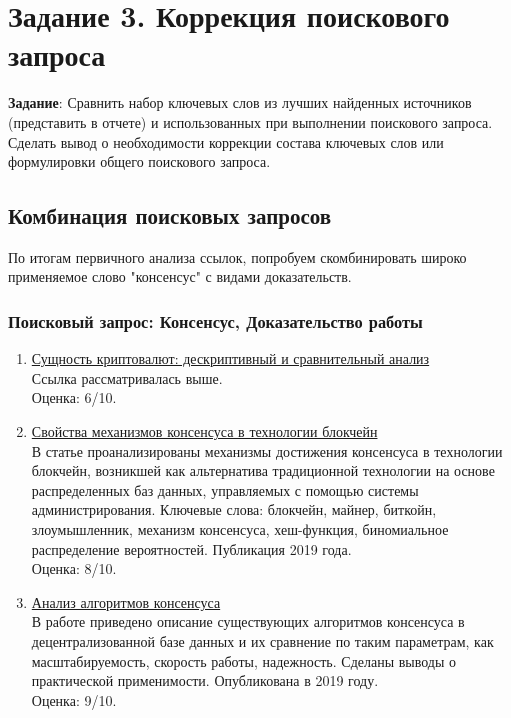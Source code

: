 \documentclass[a4paper, 12pt]{report}		%
\begin{document}
\chapter*{Задание 3. Коррекция поискового запроса}

\textbf{Задание}: Сравнить набор ключевых слов из лучших найденных источников (представить в отчете) и использованных при выполнении поискового запроса. Сделать вывод о необходимости коррекции состава ключевых слов или формулировки общего поискового запроса.

\section*{Комбинация поисковых запросов}

По итогам первичного анализа ссылок, попробуем скомбинировать широко применяемое слово "консенсус" с видами доказательств.

\subsection*{Поисковый запрос: Консенсус, Доказательство работы}

\begin{enumerate}
\item \href{https://cyberleninka.ru/article/n/suschnost-kriptovalyut-deskriptivnyy-i-sravnitelnyy-analiz}{Сущность криптовалют: дескриптивный и сравнительный анализ}\\
Ссылка рассматривалась выше.\\
Оценка: 6/10.
\item \href{https://elibrary.ru/item.asp?id=39323497}{Свойства механизмов консенсуса в технологии блокчейн}\\
В статье проанализированы механизмы достижения консенсуса в технологии блокчейн, возникшей как альтернатива традиционной технологии на основе распределенных баз данных, управляемых с помощью системы администрирования. Ключевые слова: блокчейн, майнер, биткойн, злоумышленник, механизм консенсуса, хеш-функция, биномиальное распределение вероятностей. Публикация 2019 года.\\
Оценка: 8/10.
\item \href{https://elibrary.ru/item.asp?id=37116587}{Анализ алгоритмов консенсуса}\\
В работе приведено описание существующих алгоритмов консенсуса в децентрализованной базе данных и их сравнение по таким параметрам, как масштабируемость, скорость работы, надежность. Сделаны выводы о практической применимости. Опубликована в 2019 году.\\
Оценка: 9/10.
\end{enumerate}
\end{document}
